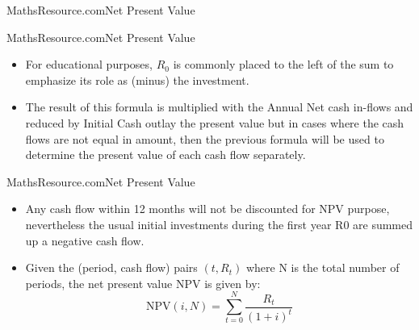 \documentclass{beamer}
\begin{document}
\begin{frame}{MathsResource.com}{Net Present Value}
\Large
{}
\end{frame}
\begin{frame}{MathsResource.com}{Net Present Value}
\Large
\begin{itemize}
\item For educational purposes, $R_0$ is commonly placed to the left of the sum to emphasize its role as (minus) the investment.
\item The result of this formula is multiplied with the Annual Net cash in-flows and reduced by Initial Cash outlay the present value but in cases where the cash flows are not equal in amount, then the previous formula will be used to determine the present value of each cash flow separately. 
\end{itemize}

\end{frame}

\begin{frame}{MathsResource.com}{Net Present Value}
\Large
\begin{itemize}
\item Any cash flow within 12 months will not be discounted for NPV purpose, nevertheless the usual initial investments during the first year R0 are summed up a negative cash flow.

\item Given the (period, cash flow) pairs $(t, R_t)$ where N is the total number of periods, the net present value $\mathrm{NPV}$ is given by:
\[\mathrm{NPV}(i, N) = \sum_{t=0}^{N} \frac{R_t}{(1+i)^{t}}\]
\end{itemize}
\end{frame}
\end{document}
